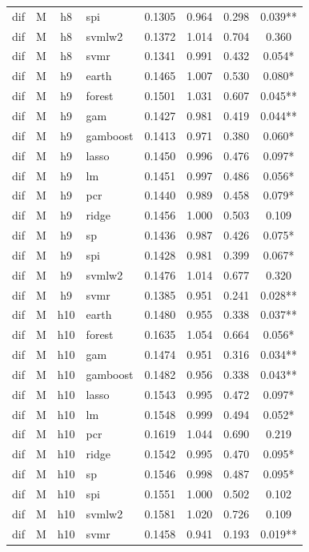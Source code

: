 \begin{ThreePartTable}
\begin{longtable}[t]{llclcccc}
dif & M & h8 & spi & 0.1305 & 0.964 & 0.298 & 0.039**\\
dif & M & h8 & svmlw2 & 0.1372 & 1.014 & 0.704 & 0.360\\
dif & M & h8 & svmr & 0.1341 & 0.991 & 0.432 & 0.054*\\
\addlinespace
dif & M & h9 & earth & 0.1465 & 1.007 & 0.530 & 0.080*\\
dif & M & h9 & forest & 0.1501 & 1.031 & 0.607 & 0.045**\\
dif & M & h9 & gam & 0.1427 & 0.981 & 0.419 & 0.044**\\
dif & M & h9 & gamboost & 0.1413 & 0.971 & 0.380 & 0.060*\\
dif & M & h9 & lasso & 0.1450 & 0.996 & 0.476 & 0.097*\\
dif & M & h9 & lm & 0.1451 & 0.997 & 0.486 & 0.056*\\
dif & M & h9 & pcr & 0.1440 & 0.989 & 0.458 & 0.079*\\
dif & M & h9 & ridge & 0.1456 & 1.000 & 0.503 & 0.109\\
dif & M & h9 & sp & 0.1436 & 0.987 & 0.426 & 0.075*\\
dif & M & h9 & spi & 0.1428 & 0.981 & 0.399 & 0.067*\\
dif & M & h9 & svmlw2 & 0.1476 & 1.014 & 0.677 & 0.320\\
dif & M & h9 & svmr & 0.1385 & 0.951 & 0.241 & 0.028**\\
\addlinespace
dif & M & h10 & earth & 0.1480 & 0.955 & 0.338 & 0.037**\\
dif & M & h10 & forest & 0.1635 & 1.054 & 0.664 & 0.056*\\
dif & M & h10 & gam & 0.1474 & 0.951 & 0.316 & 0.034**\\
dif & M & h10 & gamboost & 0.1482 & 0.956 & 0.338 & 0.043**\\
dif & M & h10 & lasso & 0.1543 & 0.995 & 0.472 & 0.097*\\
dif & M & h10 & lm & 0.1548 & 0.999 & 0.494 & 0.052*\\
dif & M & h10 & pcr & 0.1619 & 1.044 & 0.690 & 0.219\\
dif & M & h10 & ridge & 0.1542 & 0.995 & 0.470 & 0.095*\\
dif & M & h10 & sp & 0.1546 & 0.998 & 0.487 & 0.095*\\
dif & M & h10 & spi & 0.1551 & 1.000 & 0.502 & 0.102\\
dif & M & h10 & svmlw2 & 0.1581 & 1.020 & 0.726 & 0.109\\
dif & M & h10 & svmr & 0.1458 & 0.941 & 0.193 & 0.019**\\

\end{longtable}
\end{ThreePartTable}
